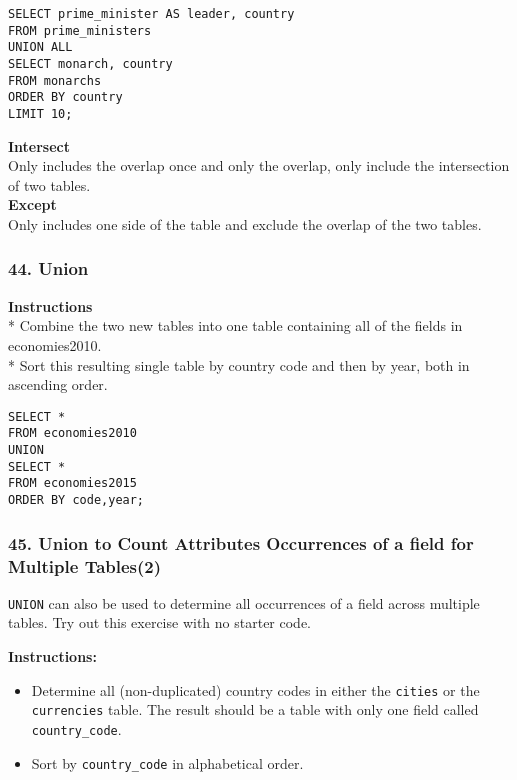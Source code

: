 \documentclass[
]{article}
\providecommand{\tightlist}{%
  \setlength{\itemsep}{0pt}\setlength{\parskip}{0pt}}
\begin{document}
\begin{verbatim}
SELECT prime_minister AS leader, country
FROM prime_ministers
UNION ALL
SELECT monarch, country
FROM monarchs
ORDER BY country
LIMIT 10;
\end{verbatim}

\textbf{Intersect}\\
Only includes the overlap once and only the overlap, only include the
intersection of two tables.\\
\textbf{Except}\\
Only includes one side of the table and exclude the overlap of the two
tables.

\hypertarget{union}{%
\subsubsection{44. Union}\label{union}}

\textbf{Instructions}\\
* Combine the two new tables into one table containing all of the fields
in economies2010.\\
* Sort this resulting single table by country code and then by year,
both in ascending order.

\begin{verbatim}
SELECT *
FROM economies2010
UNION
SELECT *
FROM economies2015
ORDER BY code,year;
\end{verbatim}

\hypertarget{union-to-count-attributes-occurrences-of-a-field-for-multiple-tables2}{%
\subsubsection{45. Union to Count Attributes Occurrences of a field for
Multiple
Tables(2)}\label{union-to-count-attributes-occurrences-of-a-field-for-multiple-tables2}}

\texttt{UNION} can also be used to determine all occurrences of a field
across multiple tables. Try out this exercise with no starter code.

\textbf{Instructions:}

\begin{itemize}
\tightlist
\item
  Determine all (non-duplicated) country codes in either the
  \texttt{cities} or the \texttt{currencies} table. The result should be
  a table with only one field called \texttt{country\_code}.\\
\item
  Sort by \texttt{country\_code} in alphabetical order.
\end{itemize}
\end{document}
